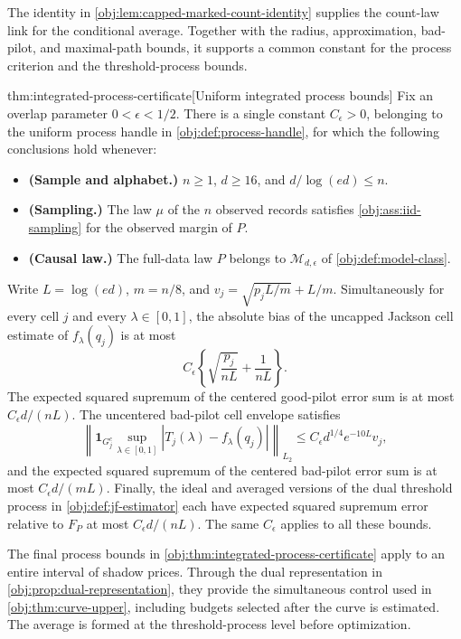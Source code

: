 \documentclass[11pt]{article}
\begin{document}
The identity in \cref{obj:lem:capped-marked-count-identity} supplies the count-law link for the conditional average. Together with the radius, approximation, bad-pilot, and maximal-path bounds, it supports a common constant for the process criterion and the threshold-process bounds.

\begin{theoremv}{thm:integrated-process-certificate}[Uniform integrated process bounds]
Fix an overlap parameter \(0<\epsilon<1/2\). There is a single constant \(C_\epsilon>0\), belonging to the uniform process handle in \cref{obj:def:process-handle}, for which the following conclusions hold whenever:

\begin{itemize}
\item \textbf{(Sample and alphabet.)} \(n\geq1\), \(d\geq16\), and \(d/\log(ed)\leq n\).
\item \textbf{(Sampling.)} The law \(\mu\) of the \(n\) observed records satisfies \cref{obj:ass:iid-sampling} for the observed margin of \(P\).
\item \textbf{(Causal law.)} The full-data law \(P\) belongs to \(\mathcal M_{d,\epsilon}\) of \cref{obj:def:model-class}.
\end{itemize}

Write \(L=\log(ed)\), \(m=n/8\), and \(v_j=\sqrt{p_jL/m}+L/m\). Simultaneously for every cell \(j\) and every \(\lambda\in[0,1]\), the absolute bias of the uncapped Jackson cell estimate of \(f_\lambda(q_j)\) is at most
\[
C_\epsilon\left\{\sqrt{\frac{p_j}{nL}}+\frac{1}{nL}\right\}.
\]
The expected squared supremum of the centered good-pilot error sum is at most \(C_\epsilon d/(nL)\). The uncentered bad-pilot cell envelope satisfies
\[
\left\|\mathbf 1_{G_j^c}\sup_{\lambda\in[0,1]}
\left|T_j(\lambda)-f_\lambda(q_j)\right|\right\|_{L_2}
\leq C_\epsilon d^{1/4}e^{-10L}v_j,
\]
and the expected squared supremum of the centered bad-pilot error sum is at most \(C_\epsilon d/(mL)\). Finally, the ideal and averaged versions of the dual threshold process in \cref{obj:def:jf-estimator} each have expected squared supremum error relative to \(F_P\) at most \(C_\epsilon d/(nL)\). The same \(C_\epsilon\) applies to all these bounds.
\end{theoremv}

The final process bounds in \cref{obj:thm:integrated-process-certificate} apply to an entire interval of shadow prices. Through the dual representation in \cref{obj:prop:dual-representation}, they provide the simultaneous control used in \cref{obj:thm:curve-upper}, including budgets selected after the curve is estimated. The average is formed at the threshold-process level before optimization.
\end{document}
